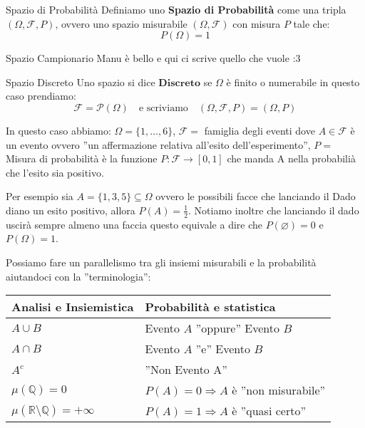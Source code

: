 \documentclass[11pt, a4paper, twoside]{article}
\begin{document}
\begin{defn}{Spazio di Probabilità}{}
	Definiamo uno \textbf{Spazio di Probabilità} come una tripla $(\Omega,\mathcal F, P)$, ovvero uno spazio misurabile $(\Omega,\mathcal F)$ con misura $P$ tale che:
	\[
		P(\Omega)= 1
	\] 
\end{defn}
\begin{defn}{Spazio Campionario}{}
	Manu è bello e qui ci scrive quello che vuole :3
\end{defn}
\begin{defn}{Spazio Discreto}{}
	Uno spazio si dice $\textbf{Discreto}$ se $\Omega$ è finito o numerabile in questo caso prendiamo:
	\[
		\mathcal F =\mathcal P(\Omega)\quad \text{e scriviamo}\quad (\Omega,\mathcal F, P)=(\Omega, P)
	\]
\end{defn}
\begin{es}
	In questo caso abbiamo: $\Omega=\{1,\dots,6\}$, $\mathcal F=$ famiglia degli eventi dove $A\in\mathcal F$ è un evento ovvero ''un affermazione relativa all'esito dell'esperimento'', $P=$ Misura di probabilità è la funzione $P:\mathcal F\rightarrow[0,1]$ che manda A nella probabilià che l'esito sia positivo.   

Per esempio sia $A= \{1,3,5\}\subseteq \Omega$ ovvero le possibili facce che lanciando il Dado diano un esito positivo, allora $P(A)=\frac{1}{2}$. Notiamo inoltre che lanciando il dado uscirà sempre almeno una faccia questo equivale a dire che $P(\varnothing)=0$ e $P(\Omega)=1$.
\end{es}
\begin{oss}
	Possiamo fare un parallelismo tra gli insiemi misurabili e la probabilità aiutandoci con la ''terminologia'':
	\begin{center}
		\begin{tabular}{|l|l|}
			\hline
			\textbf{Analisi e Insiemistica} & \textbf{Probabilità e statistica}\\
			\hline
			{$A\cup B$} & {Evento $A$ ''oppure'' Evento $B$}\\
			\hline
			{$A\cap B$} & {Evento $A$ ''e'' Evento $B$}\\
			\hline
			{$A^c$} & {''Non Evento A''}\\
			\hline
			{$\mu(\mathbb{Q})=0$} & {$P(A)=0\Rightarrow A$ è ''non misurabile''}\\
			\hline
			{$\mu(\mathbb{R}\setminus\mathbb{Q})=+\infty$} & {$P(A)=1\Rightarrow A$ è ''quasi certo''}\\
			\hline
		\end{tabular}
	\end{center}
\end{oss}
\end{document}
